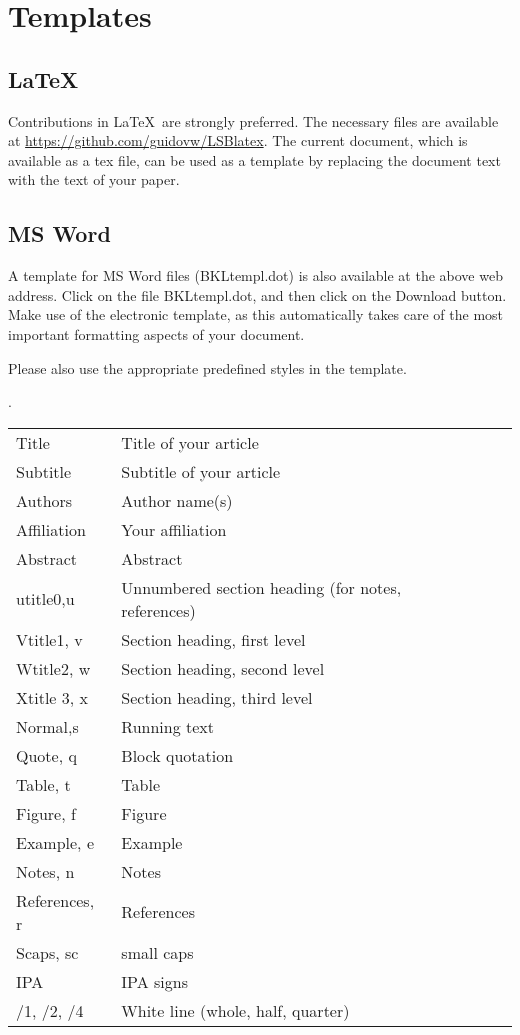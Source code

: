 \documentclass[times,linguex]{lsb}
\begin{document}
\section{Templates}

\subsection{\LaTeX\ }
Contributions in \LaTeX\ are strongly preferred. The necessary files are available at \url{https://github.com/guidovw/LSBlatex}. The current document, which is available as a tex file, can be used as a template by replacing the document text with the text of your paper.

\subsection{MS Word}

A template for MS Word files (BKLtempl.dot) is also available at the above web address. Click on the file BKLtempl.dot, and then click on the Download button. Make use of the electronic template, as this automatically takes care of the most important formatting aspects of your document. 

Please also use the appropriate predefined styles in the template.

\ex. \begin{tabular}[t]{llll@{\hskip 36pt}}
Title			& Title of your article\\
Subtitle		& Subtitle of your article\\
Authors		& Author name(s)\\
Affiliation	& Your affiliation\\
Abstract	& 	Abstract\\
utitle0,u	& 	Unnumbered section heading (for notes, references)\\
Vtitle1, v	& 	Section heading, first level\\
Wtitle2, w	& 	Section heading, second level\\
Xtitle 3, x	& 	Section heading, third level\\
Normal,s & Running text \\
Quote, q	& 	Block quotation\\
Table, t	& 	Table\\
Figure, f	& 	Figure\\
Example, e	& 	Example\\
Notes, n	& 	Notes\\
References, r	& 	References\\
Scaps, sc	& 	small caps\\
IPA		& 	IPA signs \\
/1, /2, /4	& 	White line (whole, half, quarter)   \\
\end{tabular}
\end{document}
